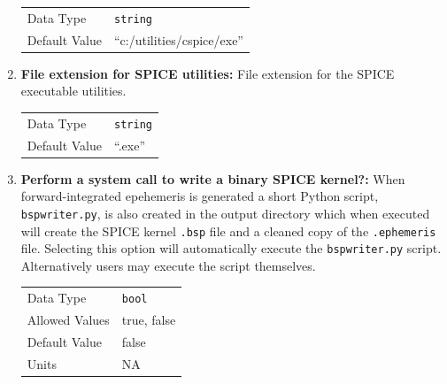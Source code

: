 \begin{enumerate}
    \begin{table}[H]
        \hspace{2cm}
        \begin{tabular}{ll}
        Data Type & \verb|string| \\
        Default Value & ``c:/utilities/cspice/exe'' \\
        \end{tabular}
    \end{table}

\item{\textbf{File extension for \ac{SPICE} utilities:}} File extension for the \ac{SPICE} executable utilities.

    \begin{table}[H]
        \hspace{2cm}
        \begin{tabular}{ll}
        Data Type & \verb|string| \\
        Default Value & ``.exe'' \\
        \end{tabular}
    \end{table}

\item{\textbf{Perform a system call to write a binary \ac{SPICE} kernel?:}} When forward-integrated epehemeris is generated a short Python script, \verb|bspwriter.py|, is also created in the output directory which when executed will create the \ac{SPICE} kernel \verb|.bsp| file and a cleaned copy of the \verb|.ephemeris| file. Selecting this option will automatically execute the \verb|bspwriter.py| script. Alternatively users may execute the script themselves.

    \begin{table}[H]
        \hspace{2cm}
        \begin{tabular}{ll}
        Data Type & \verb|bool| \\
        Allowed Values & true, false \\
        Default Value & false \\
        Units & NA
        \end{tabular}
    \end{table}

\end{enumerate}





